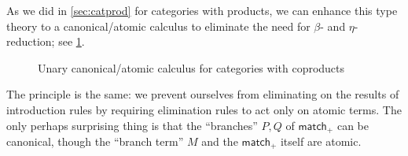 \documentclass{book}
\def\idfunc{\mathsf{id}}
\let\types\vdash
\def\type{\;\ftype}
\newcommand{\atom}{\mathrel{\downarrow}}
\newcommand{\can}{\mathrel{\uparrow}}
\newcommand{\atomcan}{\ensuremath{\mathord{\downarrow\uparrow}}}
\def\plusE{\mathord{+}E}
\def\plusI{\mathord{+}I}
\def\inl{\mathsf{inl}}
\def\inr{\mathsf{inr}}
\def\case{\mathsf{match}_+}
\def\emptyt{\mathbf{0}}
\def\abort{\mathsf{abort}}
\begin{document}
As we did in \cref{sec:catprod} for categories with products, we can enhance this type theory to a canonical/atomic calculus to eliminate the need for $\beta$- and $\eta$-reduction; see \cref{fig:catcoprod-atomcan}.
\begin{figure}
  \centering
  \caption{Unary canonical/atomic calculus for categories with coproducts}
  \label{fig:catcoprod-atomcan}
\end{figure}
The principle is the same: we prevent ourselves from eliminating on the results of introduction rules by requiring elimination rules to act only on atomic terms.
The only perhaps surprising thing is that the ``branches'' $P,Q$ of $\case$ can be canonical, though the ``branch term'' $M$ and the $\case$ itself are atomic.
\end{document}
